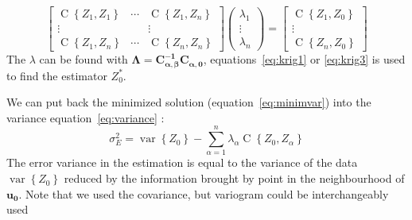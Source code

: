 \documentclass[twocolumn]{article}
\numberwithin{equation}{section}
\begin{document}
\[
		\begin{bmatrix}
       		\operatorname{C}\left\{Z_1,Z_1\right\} 	& \cdots & \operatorname{C}\left\{Z_1,Z_n\right\}   \\
       		\vdots 												& & \vdots 												\\
       		\operatorname{C}\left\{Z_1,Z_n\right\}  & \cdots & \operatorname{C}\left\{Z_n,Z_n\right\}
     	\end{bmatrix}
     	\begin{pmatrix}
       		\lambda_1 	\\
       		\vdots 		\\
       		\lambda_n  
     	\end{pmatrix}
     	=
     	\begin{bmatrix}
       		\operatorname{C}\left\{Z_1,Z_0\right\} \\
       		\vdots 												\\
       		\operatorname{C}\left\{Z_n,Z_0\right\} 
     	\end{bmatrix}
\]   
The $\lambda$ can be found with $\boldsymbol{\Lambda} = \boldsymbol{C_{\alpha,\beta}^{-1}} \boldsymbol{C_{\alpha,0}} $, equations~\ref{eq:krig1} or \ref{eq:krig3} is used to find the estimator $Z_0^*$.

We can put back the minimized solution (equation~\ref{eq:minimvar}) into the variance equation~\ref{eq:variance} :
\begin{equation}
	\sigma^2_E  = \operatorname{var}\left\{Z_0\right\} - \sum_{\alpha=1}^n \lambda_\alpha \operatorname{C}\left\{Z_0, Z_\alpha\right\}
\end{equation}
The error variance in the estimation is equal to the variance of the data $\operatorname{var}\left\{Z_0\right\}$ reduced by the information brought by  point in the neighbourhood of $\boldsymbol{u_0}$. Note that we used the covariance, but variogram could be interchangeably used 
\end{document}
